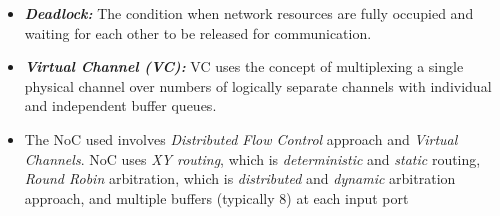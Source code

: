 \begin {frame}
    \begin {itemize}
     \item \textbf {\textit{Deadlock:}} The condition when network resources are fully occupied and 
	  waiting for each other to be released for communication.
      
     \item  \textbf {\textit{Virtual Channel (VC):}} VC uses the concept of multiplexing 
	  a single physical channel over numbers of logically separate channels with 
	  individual and independent buffer queues. 

      \item The NoC used involves \textit{Distributed Flow Control} approach and \textit{Virtual Channels}.
	  NoC uses \textit{XY routing}, which is \textit{deterministic} and \textit{static} routing,
	  \textit{Round Robin} arbitration, which is \textit{distributed} and \textit{dynamic} arbitration approach, 
	  and multiple buffers (typically 8) at each input port
    \end {itemize} 
\end {frame}


